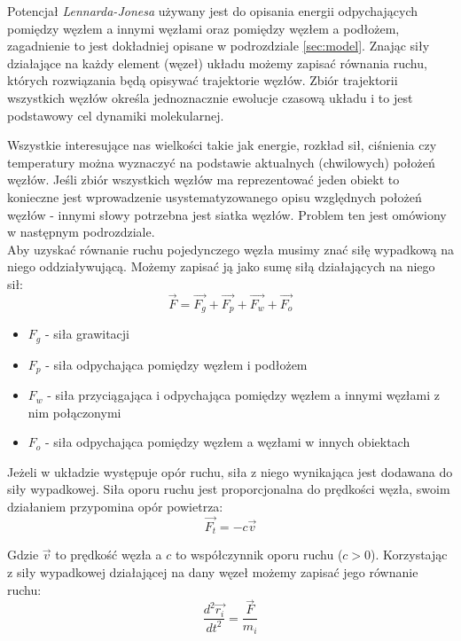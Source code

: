 \documentclass[12pt, letterpaper]{report}
\begin{document}
    Potencjał \emph{Lennarda-Jonesa} używany jest do opisania 
    energii odpychających pomiędzy węzłem a innymi węzłami oraz pomiędzy węzłem a podłożem, zagadnienie 
    to jest dokładniej opisane w podrozdziale \ref{sec:model}.
    Znając siły działające na każdy element (węzeł) układu możemy zapisać równania ruchu, 
    których rozwiązania będą opisywać trajektorie węzłów. 
    Zbiór trajektorii wszystkich węzłów określa jednoznacznie ewolucje czasową układu
    i to jest podstawowy cel dynamiki molekularnej. 

    Wszystkie interesujące nas wielkości 
    takie jak energie, rozkład sił, ciśnienia czy temperatury można wyznaczyć 
    na podstawie aktualnych (chwilowych) położeń węzłów.
    Jeśli zbiór wszystkich węzłów ma reprezentować jeden obiekt to konieczne jest 
    wprowadzenie usystematyzowanego opisu względnych położeń węzłów - innymi słowy 
    potrzebna jest siatka węzłów. Problem ten jest omówiony w następnym podrozdziale. \\

    Aby uzyskać równanie ruchu pojedynczego węzła musimy znać siłę wypadkową na niego oddziaływującą.
    Możemy zapisać ją jako sumę siłą działających na niego sił:
    \begin{equation}
        \vec{F} = \vec{F_{g}} + \vec{F_{p}} + \vec{F_{w}} + \vec{F_{o}}
    \end{equation}

    \begin{itemize}
        \item $F_{g}$ - siła grawitacji
        \item $F_{p}$ - siła odpychająca pomiędzy węzłem i podłożem
        \item $F_{w}$ - siła przyciągająca i odpychająca pomiędzy węzłem a innymi węzłami z nim połączonymi
        \item $F_{o}$ - siła odpychająca pomiędzy węzłem a węzłami w innych obiektach
    \end{itemize}

    Jeżeli w układzie występuje opór ruchu, siła z niego wynikająca
    jest dodawana do siły wypadkowej.
    Siła oporu ruchu jest proporcjonalna do prędkości węzła,
    swoim działaniem przypomina opór powietrza:
    \begin{equation}
        \vec{F_{t}} = - c \vec{v}
    \end{equation}

    Gdzie $\vec{v}$ to prędkość węzła a $c$ to współczynnik oporu ruchu ($c > 0$).
    Korzystając z siły wypadkowej działającej na dany węzeł możemy zapisać jego równanie ruchu:
    \begin{equation}
        \frac{d^{2} \vec{r_i}}{dt^{2}} = \frac{\vec{F}}{m_i}
    \end{equation}
\end{document}
